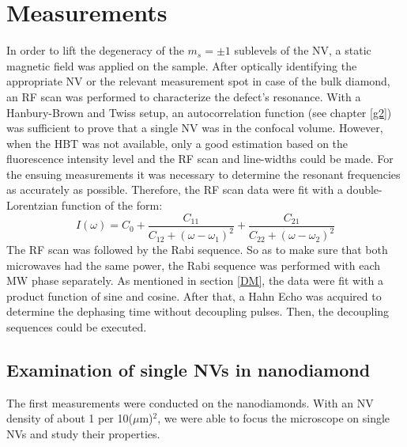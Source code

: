 \documentclass[12pt,a4paper]{article}
\begin{document}
\section{Measurements}
In order to lift the degeneracy of the $m_s=\pm1$ sublevels of the NV, a static magnetic field was applied on the sample. After optically identifying the appropriate NV or the relevant measurement spot in case of the bulk diamond, an RF scan was performed to characterize the defect's resonance. With a Hanbury-Brown and Twiss setup, an autocorrelation function (see chapter \ref{g2}) was sufficient to prove that a single NV was in the confocal volume. However, when the HBT was not available, only a good estimation based on the fluorescence intensity level and the RF scan and line-widths could be made.
 For the ensuing measurements it was necessary to determine the resonant frequencies as accurately as possible. Therefore, the RF scan data were fit with a double-Lorentzian function of the form:
\begin{equation}
I(\omega)=C_0+\frac{C_{11}}{C_{12}+(\omega-\omega_1)^2}+ \frac{C_{21}}{C_{22}+(\omega-\omega_2)^2}
\end{equation}  
The RF scan was followed by the Rabi sequence. So as to make sure that both microwaves had the same power, the Rabi sequence was performed with each MW phase separately. As mentioned in section \ref{DM}, the data were fit with a product function of sine and cosine. After that, a Hahn Echo was acquired to determine the dephasing time without decoupling pulses. Then, the decoupling sequences could be executed. 
\subsection{Examination of single NVs in nanodiamond}
The first measurements were conducted on the nanodiamonds. With an NV density of about 1 per 10($\mu$m)$^2$, we were able to focus the microscope on single NVs and study their properties.
\end{document}
